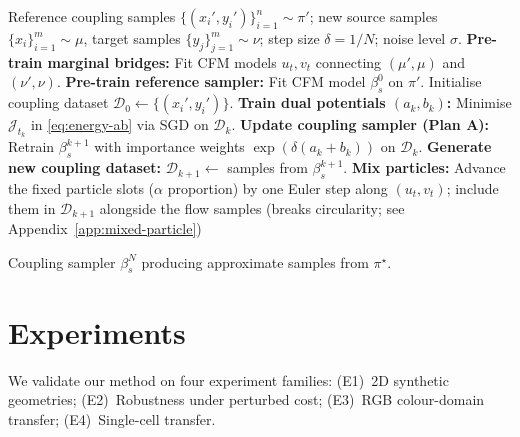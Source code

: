 \documentclass[11pt]{article}
\theoremstyle{definition}
\numberwithin{equation}{section}%
\begin{document}
\begin{algorithm}[t]
\caption{\textbf{TACO}: Generative Transfer for EOT with Unknown Cost}
\label{alg:OURMETHOD}
\begin{algorithmic}[1]
\REQUIRE Reference coupling samples $\{(x_i',y_i')\}_{i=1}^n\sim\pi'$;
         new source samples $\{x_i\}_{i=1}^m\sim\mu$, target samples $\{y_j\}_{j=1}^m\sim\nu$;
         step size $\delta=1/N$; noise level $\sigma$.
\STATE \textbf{Pre-train marginal bridges:} Fit CFM models $u_t, v_t$ connecting $(\mu',\mu)$ and $(\nu',\nu)$.
\STATE \textbf{Pre-train reference sampler:} Fit CFM model $\beta_s^0$ on $\pi'$.
\STATE Initialise coupling dataset $\mathcal D_0 \leftarrow \{(x_i',y_i')\}$.
  \STATE \textbf{Train dual potentials $(a_k,b_k)$:} Minimise $\mathcal J_{t_k}$
         in \eqref{eq:energy-ab} via SGD on $\mathcal D_k$.
  \STATE \textbf{Update coupling sampler (Plan A):} Retrain $\beta_s^{k+1}$ with
         importance weights $\exp(\delta(a_k+b_k))$ on $\mathcal D_k$.
  \STATE \textbf{Generate new coupling dataset:} $\mathcal D_{k+1}\leftarrow$
         samples from $\beta_s^{k+1}$.
    \STATE \textbf{Mix particles:} Advance the fixed particle slots ($\alpha$ proportion) by one Euler step along $(u_t,v_t)$; include them in $\mathcal{D}_{k+1}$ alongside the flow samples (breaks circularity; see Appendix~\ref{app:mixed-particle})

\ENDFOR
\ENSURE Coupling sampler $\beta_s^N$ producing approximate samples from $\pi^\star$.
\end{algorithmic}
\end{algorithm}

\section{Experiments}
\label{sec:experiments}

We validate our method on four experiment families:
(E1)~2D synthetic geometries;
(E2)~Robustness under perturbed cost;
(E3)~RGB colour-domain transfer;
(E4)~Single-cell transfer.
\end{document}
